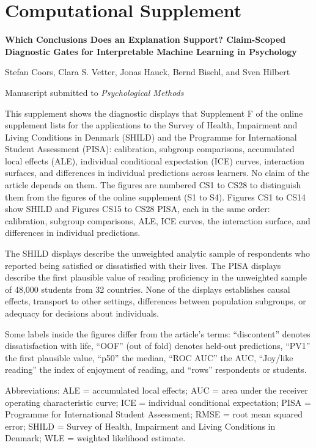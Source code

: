 \documentclass[11pt]{article}
\begin{document}
\section*{Computational Supplement}
{\raggedright{}\textbf{Which Conclusions Does an Explanation Support? Claim-Scoped Diagnostic Gates for Interpretable Machine Learning in Psychology}\par}
Stefan Coors, Clara S. Vetter, Jonas Hauck, Bernd Bischl, and Sven Hilbert\par
Manuscript submitted to \emph{Psychological Methods}\par
\medskip
This supplement shows the diagnostic displays that Supplement F of the online supplement lists for the applications to the Survey of Health, Impairment and Living Conditions in Denmark (SHILD) and the Programme for International Student Assessment (PISA): calibration, subgroup comparisons, accumulated local effects (ALE), individual conditional expectation (ICE) curves, interaction surfaces, and differences in individual predictions across learners. No claim of the article depends on them. The figures are numbered CS1 to CS28 to distinguish them from the figures of the online supplement (S1 to S4). Figures CS1 to CS14 show SHILD and Figures CS15 to CS28 PISA, each in the same order: calibration, subgroup comparisons, ALE, ICE curves, the interaction surface, and differences in individual predictions.\par
\medskip
The SHILD displays describe the unweighted analytic sample of respondents who reported being satisfied or dissatisfied with their lives. The PISA displays describe the first plausible value of reading proficiency in the unweighted sample of 48,000 students from 32 countries. None of the displays establishes causal effects, transport to other settings, differences between population subgroups, or adequacy for decisions about individuals.\par
\medskip
Some labels inside the figures differ from the article's terms: ``discontent'' denotes dissatisfaction with life, ``OOF'' (out of fold) denotes held-out predictions, ``PV1'' the first plausible value, ``p50'' the median, ``ROC AUC'' the AUC, ``Joy/like reading'' the index of enjoyment of reading, and ``rows'' respondents or students.\par
\medskip
Abbreviations: ALE = accumulated local effects; AUC = area under the receiver operating characteristic curve; ICE = individual conditional expectation; PISA = Programme for International Student Assessment; RMSE = root mean squared error; SHILD = Survey of Health, Impairment and Living Conditions in Denmark; WLE = weighted likelihood estimate.\par
\end{document}
